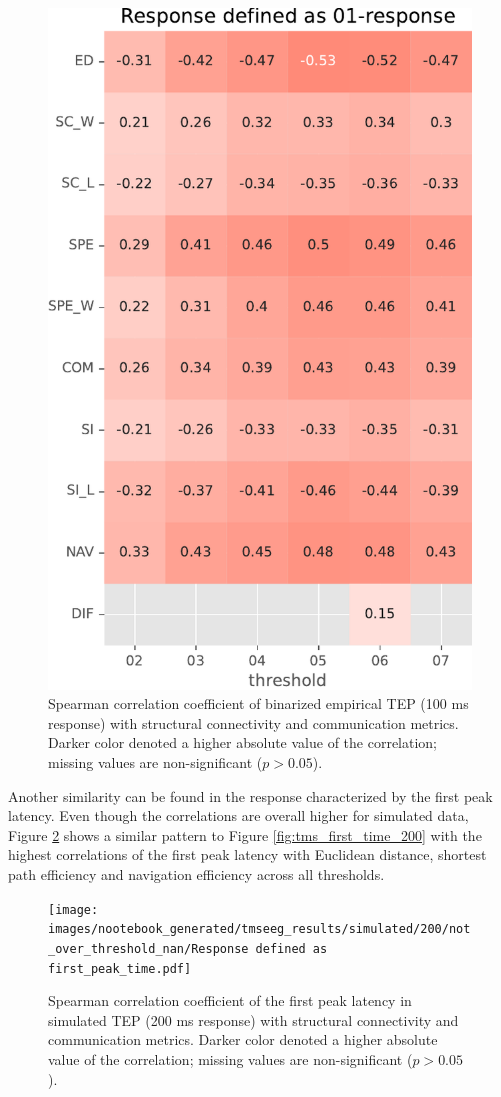 \begin{figure}
    \centering
    \includegraphics[height=\textwidth]{images/nootebook_generated/tmseeg_results/simulated/100/not_over_threshold_nan/Response defined as 01-response.pdf}
    \caption[Binarized TEP (100 ms) correlations (simulated data)]{Spearman correlation coefficient of binarized empirical TEP (100 ms response) with structural connectivity and communication metrics. Darker color denoted a higher absolute value of the correlation; missing values are non-significant ($p>0.05$).}
    \label{fig:tms_binary_100_simulated}
\end{figure}

Another similarity can be found in the response characterized by the first peak latency. Even though the correlations are overall higher for simulated data, Figure \ref{fig:tms_first_time_200_simulated} shows a similar pattern to Figure \ref{fig:tms_first_time_200} with the highest correlations of the first peak latency with Euclidean distance, shortest path efficiency and navigation efficiency across all thresholds. 

\begin{figure}
    \centering
    \texttt{[image: images/nootebook\_generated/tmseeg\_results/simulated/200/not\_over\_threshold\_nan/Response defined as first\_peak\_time.pdf]}
    \caption[TEPs first peak latency (200 ms) correlations (simulated data)]{Spearman correlation coefficient of the first peak latency in simulated TEP (200 ms response) with structural connectivity and communication metrics. Darker color denoted a higher absolute value of the correlation; missing values are non-significant ($p>0.05$).}
    \label{fig:tms_first_time_200_simulated}
\end{figure}

